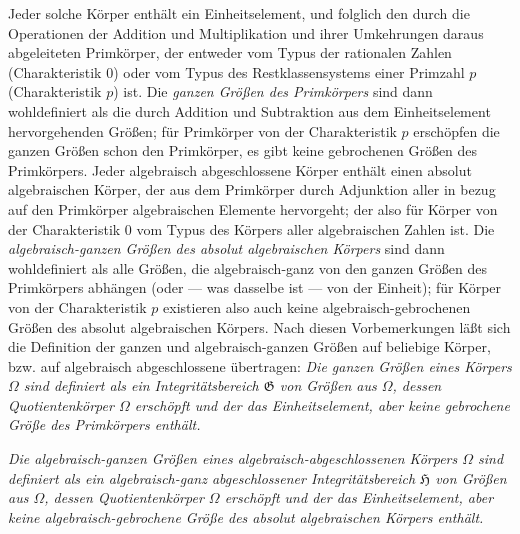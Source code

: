 Jeder solche Körper enthält ein Einheitselement, und folglich den durch die
Operationen der Addition und Multiplikation und ihrer Umkehrungen daraus
abgeleiteten \glqq{}Primkörper\grqq{}, der entweder vom Typus der rationalen Zahlen
(Charakteristik 0) oder vom Typus des Restklassensystems einer Primzahl $p$
(Charakteristik $p$) ist. Die \emph{ganzen Größen des
Primkörpers} sind dann wohldefiniert als die durch Addition und Subtraktion aus
dem Einheitselement hervorgehenden Größen; für Primkörper von der
Charakteristik $p$ erschöpfen die ganzen Größen schon den Primkörper, es gibt
keine gebrochenen Größen des Primkörpers. Jeder algebraisch abgeschlossene
Körper enthält einen \glqq{}absolut algebraischen Körper\grqq{}, der aus dem Primkörper
durch Adjunktion aller in bezug auf den Primkörper algebraischen Elemente
hervorgeht; der also für Körper von der Charakteristik 0 vom Typus des Körpers
aller algebraischen Zahlen ist. Die \emph{algebraisch-ganzen Größen des absolut
algebraischen Körpers} sind dann wohldefiniert als alle Größen, die
algebraisch-ganz von den ganzen Größen des Primkörpers abhängen (oder --- was
dasselbe ist --- von der Einheit); für Körper von der Charakteristik $p$
existieren also auch keine algebraisch-gebrochenen Größen des absolut
algebraischen Körpers. Nach diesen Vorbemerkungen läßt sich die Definition der
\glqq{}ganzen\grqq{} und \glqq{}algebraisch-ganzen\grqq{} Größen auf beliebige Körper, bzw. auf
algebraisch abgeschlossene übertragen: \emph{Die ganzen Größen eines Körpers
$\Omega$ sind definiert als ein Integritätsbereich $\mathfrak G$ von Größen
aus $\Omega$, dessen Quotientenkörper
$\Omega$ erschöpft und der das Einheitselement, aber keine gebrochene Größe
des Primkörpers enthält.}

\emph{Die algebraisch-ganzen Größen eines algebraisch-abgeschlossenen Körpers
$\Omega$ sind definiert als ein algebraisch-ganz abgeschlossener
Integritätsbereich $\mathfrak H$ von Größen aus $\Omega$, dessen
Quotientenkörper $\Omega$ erschöpft und der das Einheitselement, aber keine
algebraisch-gebrochene Größe des absolut algebraischen Körpers enthält.}

